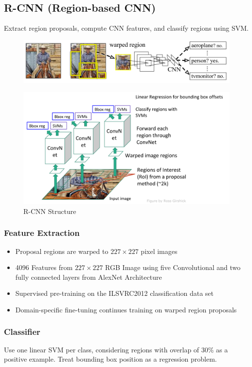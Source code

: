 \subsection{R-CNN (Region-based CNN)}
Extract region proposals, compute CNN features, and classify regions using SVM.\@

\begin{figure}[h]
	\centering
	\includegraphics[width=0.7\linewidth]{img/r-cnn}
\end{figure}

\begin{figure}[h]
	\centering
	\includegraphics[width=0.7\linewidth]{img/r-cnn_structure}
	\caption{R-CNN Structure}
\end{figure}

\subsubsection{Feature Extraction}
\begin{itemize}
	\item Proposal regions are warped to $227\times 227$ pixel images
	\item 4096 Features from $227\times 227$ RGB Image using five Convolutional and two fully connected layers from AlexNet Architecture
	\item Supervised pre-training on the ILSVRC2012 classification data set
	\item Domain-specific fine-tuning continues training on warped region proposals
\end{itemize}

\subsubsection{Classifier}
Use one linear SVM per class, considering regions with overlap of 30\% as a positive example. Treat bounding box position as a regression problem.

